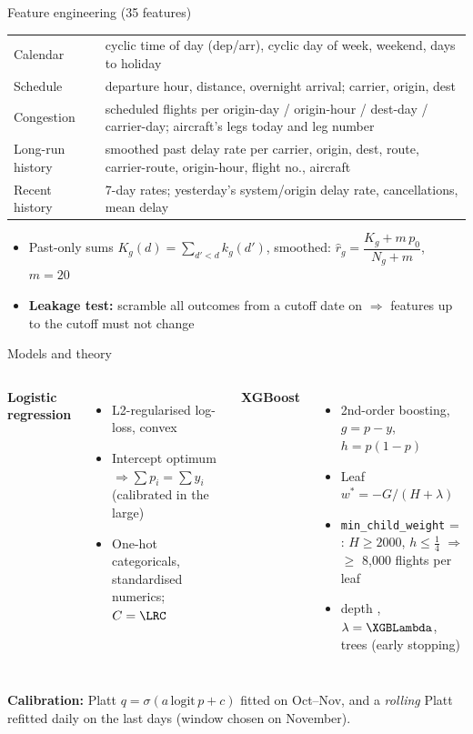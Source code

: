 \documentclass[aspectratio=169,11pt]{beamer}
\begin{document}
\begin{frame}{Feature engineering (35 features)}
\small
\begin{tabular}{p{}p{}}
\toprule
Calendar & cyclic time of day (dep/arr), cyclic day of week, weekend, days to holiday \\
Schedule & departure hour, distance, overnight arrival; carrier, origin, dest \\
Congestion & scheduled flights per origin-day / origin-hour / dest-day / carrier-day; aircraft's legs today and leg number \\
Long-run history & smoothed past delay rate per carrier, origin, dest, route, carrier-route, origin-hour, flight no., aircraft \\
Recent history & 7-day rates; yesterday's system/origin delay rate, cancellations, mean delay \\
\bottomrule
\end{tabular}
\vspace{0.5em}
\begin{itemize}
\item Past-only sums $K_g(d) = \sum_{d'<d} k_g(d')$, smoothed:
  $\hat r_g = \dfrac{K_g + m\,p_0}{N_g + m}$, $m = 20$
\item \textbf{Leakage test:} scramble all outcomes from a cutoff date on $\Rightarrow$ features up to the cutoff must not change
\end{itemize}
\end{frame}

\begin{frame}{Models and theory}
\begin{columns}[T]
\textbf{Logistic regression}
\begin{itemize}
\item L2-regularised log-loss, convex
\item Intercept optimum $\Rightarrow \sum p_i = \sum y_i$ (calibrated in the large)
\item One-hot categoricals, standardised numerics; $C = \LRC$
\end{itemize}
\textbf{XGBoost}
\begin{itemize}
\item 2nd-order boosting, $g = p - y$, $h = p(1-p)$
\item Leaf $w^* = -G/(H+\lambda)$
\item \texttt{min\_child\_weight} = \XGBMinChild: $H \ge 2000$, $h \le \tfrac14$ $\Rightarrow$ $\ge$ 8,000 flights per leaf
\item depth \XGBDepth, $\lambda = \XGBLambda$, \XGBTrees{} trees (early stopping)
\end{itemize}
\end{columns}
\vspace{0.6em}
\textbf{Calibration:} Platt $q = \sigma(a\,\mathrm{logit}\,p + c)$ fitted on Oct--Nov, and a \emph{rolling} Platt
refitted daily on the last \XGBRollWindow{} days (window chosen on November).
\end{frame}
\end{document}
